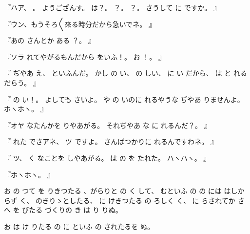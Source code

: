 『ハア、
。
ようござんす。
は？。
？。
？。
さうして
に
ですか。
』

『ウン、もうそろ〳〵來る時分だから急いでネ。
』

『あの
さんとか
ある
？。
』

『ソラ
れてやがるもんだから
をいふ！。
お
！。
』

『
ぢやあ
え、
といふんだ。
かし
の
い、
の
しい、
に
い
だから、
は
と
れるだらう。
』

『
の
い！。
よしても
さいよ。
や
の
いのに
れるやうな
ぢやあ
りませんよ。
ホヽホヽ。
』

『オヤ
なたんかを
りやあがる。
それぢやあ
な
に
れるんだ？。
』

『
れた
でさアネ、
ツ
ですよ。
さんばつかりに
れるんですわネ。
』

『
ツ、
く
なことを
しやあがる。
は
の
を
たれた。
ハヽハヽ。
』

『ホヽホヽ。
』

お
の
つて
を
りきつたる
、がらりと
の
く
して、
むといふ
の
の
には
はしからず
く、
のきりゝとしたる、
に
けきつたる
の
ろしく
く、
に
らされてか
さへ
を
びたる
づくりの
き
は
り
りぬ。

お
は
け
りたる
の
に
といふ
の
されたるを
ぬ。

